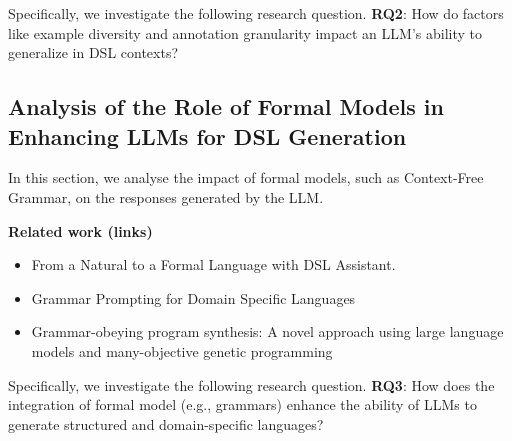 Specifically, we investigate the following research question. \textbf{RQ2}: How do factors like example diversity and annotation granularity impact an LLM’s ability to generalize in DSL contexts?

\subsection{Analysis of the Role of Formal Models in Enhancing LLMs for DSL Generation}

In this section, we analyse the impact of formal models, such as Context-Free Grammar, on the responses generated by the LLM.

\textbf{Related work (links)}
\begin{itemize}
    \item From a Natural to a Formal Language with DSL Assistant.
    \item Grammar Prompting for Domain Specific Languages
    \item Grammar-obeying program synthesis: A novel approach using large language models and many-objective genetic programming

\end{itemize}

Specifically, we investigate the following research question. \textbf{RQ3}: How does the integration of formal model (e.g., grammars) enhance the ability of LLMs to generate structured and domain-specific languages?
